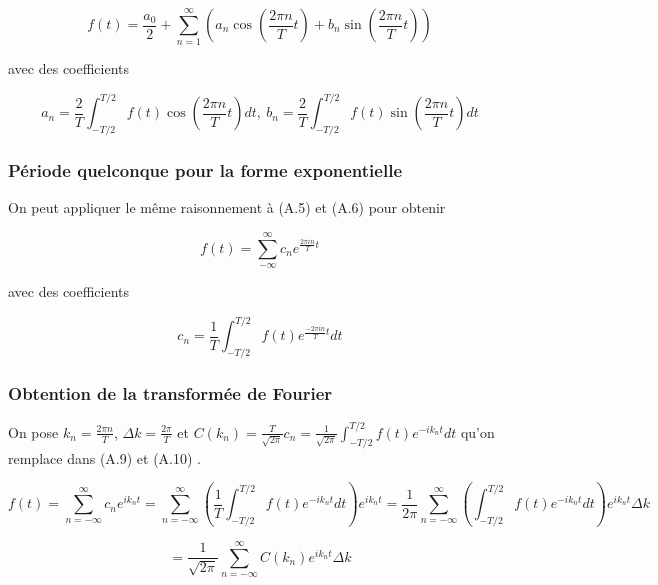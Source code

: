 \begin{equation}
    f(t) = \frac{a_0}{2} + \sum_{n=1}^{\infty} \left(a_n \cos\left(\frac{2\pi n}{T}t\right) + b_n \sin\left(\frac{2\pi n}{T}t\right)\right)
\end{equation}

avec des coefficients 

\begin{equation}
    a_n = \frac{2}{T} \int_{-T/2}^{T/2} f(t) \cos \left(\frac{2\pi n }{T}t\right) dt, \ b_n = \frac{2}{T} \int_{-T/2}^{T/2} f(t) \sin \left(\frac{2\pi n }{T}t\right) dt  
\end{equation}

\subsubsection*{Période quelconque pour la forme exponentielle}
On peut appliquer le même raisonnement à (A.5) et (A.6) pour obtenir

\begin{equation}
    f(t) = \sum_{-\infty}^{\infty} c_n e^{\frac{2\pi i n}{T}t}
\end{equation}

avec des coefficients 

\begin{equation}
    c_n = \frac{1}{T} \int_{-T/2}^{T/2} f(t) e^{\frac{-2\pi i n}{T}t} dt
\end{equation}

\subsubsection*{Obtention de la transformée de Fourier}
On pose $k_n = \frac{2\pi n}{T}$, $\Delta k = \frac{2\pi}{T}$ et $C(k_n) = \frac{T}{\sqrt{2\pi}}c_n = \frac{1}{\sqrt{2\pi}}\int_{-T/2}^{T/2}f(t)e^{-i k_n t} dt$ qu'on remplace dans (A.9) et (A.10) \cite{Schumacher_Westmoreland_2010}.

\begin{equation*}
    f(t) = \sum_{n = -\infty}^{\infty} c_n e^{i k_n t} = \sum_{n = -\infty}^{\infty} \left(\frac{1}{T}\int_{-T/2}^{T/2} f(t) e^{-i k_n t} dt\right) e^{ik_n t} = \frac{1}{2\pi} \sum_{n = -\infty}^{\infty} \left(\int_{-T/2}^{T/2} f(t)e^{-i k_n t} dt\right) e^{i k_n t} \Delta k
\end{equation*}

\begin{equation}
    = \frac{1}{\sqrt{2\pi}} \sum_{n = -\infty}^{\infty} C(k_n) e^{i k_n t} \Delta k
\end{equation}

